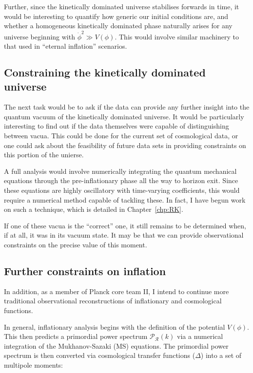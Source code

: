 Further, since the kinetically dominated universe stabilises forwards in time, it would be interesting to quantify how generic our initial conditions are, and whether a homogeneous kinetically dominated phase naturally arises for any universe beginning with \(\dot{\phi}^2\gg V(\phi)\). This would involve similar machinery to that used in ``eternal inflation'' scenarios.


\subsection*{Constraining the kinetically dominated universe}

The next task would be to ask if the data can provide any further insight into the quantum vacuum of the kinetically dominated universe. It would be particularly interesting to find out if the data themselves were capable of distinguishing between vacua. This could be done for the current set of cosmological data, or one could ask about the feasibility of future data sets in providing constraints on this portion of the unierse.

A full analysis would involve numerically integrating the quantum mechanical equations through the pre-inflationary phase all the way to horizon exit. Since these equations are highly oscillatory with time-varying coefficients, this would require a numerical method capable of tackling these. In fact, I have begun work on such a technique, which is detailed in Chapter~\ref{chp:RK}.

If one of these vacua is the ``correct'' one, it still remains to be determined when, if at all, it was in its vacuum state. It may be that we can provide observational constraints on the precise value of this moment.

\subsection*{Further constraints on inflation}
In addition, as a member of Planck core team II, I intend to continue more traditional observational reconstructions of inflationary and cosmological functions.

In general, inflationary analysis begins with the definition of the potential \(V(\phi)\). This then predicts a primordial power spectrum \(\mathcal{P}_\mathcal{R}(k)\) via a numerical integration of the Mukhanov-Sazaki (MS) equations. The primordial power spectrum is then converted via cosmological transfer functions (\(\Delta\)) into a set of multipole moments:

